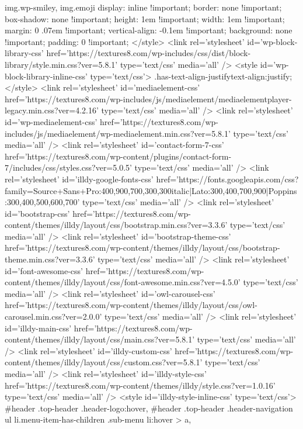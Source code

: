 img.wp-smiley,
img.emoji {
	display: inline !important;
	border: none !important;
	box-shadow: none !important;
	height: 1em !important;
	width: 1em !important;
	margin: 0 .07em !important;
	vertical-align: -0.1em !important;
	background: none !important;
	padding: 0 !important;
}
</style>
	<link rel='stylesheet' id='wp-block-library-css'  href='https://textures8.com/wp-includes/css/dist/block-library/style.min.css?ver=5.8.1' type='text/css' media='all' />
<style id='wp-block-library-inline-css' type='text/css'>
.has-text-align-justify{text-align:justify;}
</style>
<link rel='stylesheet' id='mediaelement-css'  href='https://textures8.com/wp-includes/js/mediaelement/mediaelementplayer-legacy.min.css?ver=4.2.16' type='text/css' media='all' />
<link rel='stylesheet' id='wp-mediaelement-css'  href='https://textures8.com/wp-includes/js/mediaelement/wp-mediaelement.min.css?ver=5.8.1' type='text/css' media='all' />
<link rel='stylesheet' id='contact-form-7-css'  href='https://textures8.com/wp-content/plugins/contact-form-7/includes/css/styles.css?ver=5.0.5' type='text/css' media='all' />
<link rel='stylesheet' id='illdy-google-fonts-css'  href='https://fonts.googleapis.com/css?family=Source+Sans+Pro:400,900,700,300,300italic|Lato:300,400,700,900|Poppins:300,400,500,600,700' type='text/css' media='all' />
<link rel='stylesheet' id='bootstrap-css'  href='https://textures8.com/wp-content/themes/illdy/layout/css/bootstrap.min.css?ver=3.3.6' type='text/css' media='all' />
<link rel='stylesheet' id='bootstrap-theme-css'  href='https://textures8.com/wp-content/themes/illdy/layout/css/bootstrap-theme.min.css?ver=3.3.6' type='text/css' media='all' />
<link rel='stylesheet' id='font-awesome-css'  href='https://textures8.com/wp-content/themes/illdy/layout/css/font-awesome.min.css?ver=4.5.0' type='text/css' media='all' />
<link rel='stylesheet' id='owl-carousel-css'  href='https://textures8.com/wp-content/themes/illdy/layout/css/owl-carousel.min.css?ver=2.0.0' type='text/css' media='all' />
<link rel='stylesheet' id='illdy-main-css'  href='https://textures8.com/wp-content/themes/illdy/layout/css/main.css?ver=5.8.1' type='text/css' media='all' />
<link rel='stylesheet' id='illdy-custom-css'  href='https://textures8.com/wp-content/themes/illdy/layout/css/custom.css?ver=5.8.1' type='text/css' media='all' />
<link rel='stylesheet' id='illdy-style-css'  href='https://textures8.com/wp-content/themes/illdy/style.css?ver=1.0.16' type='text/css' media='all' />
<style id='illdy-style-inline-css' type='text/css'>
#header .top-header .header-logo:hover,
#header .top-header .header-navigation ul li.menu-item-has-children .sub-menu li:hover > a,
